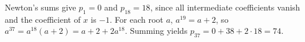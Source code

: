 Newton's sums give $ p_1=0 $ and $ p_{18}=18 $, since all intermediate coefficients vanish and the coefficient of $ x $ is $-1 $. For each root $ a $, $ a^{19}=a+2 $, so $ a^{37}=a^{18}(a+2)=a+2+2a^{18}$. Summing yields $ p_{37}=0+38+2\cdot18=\boxed{74}$.
